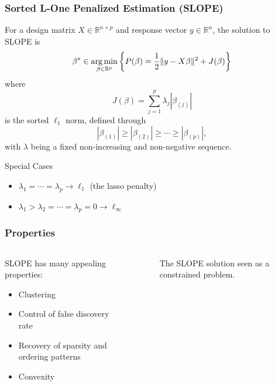\documentclass[10pt,aspectratio=169]{beamer}
\begin{document}
\begin{frame}[c]
  \frametitle{Sorted L-One Penalized Estimation (SLOPE)}

  For a design matrix \(X \in \mathbb{R}^{n \times p}\) and response vector \(y \in \mathbb{R}^n\), the solution to SLOPE is
  \[
    \beta^* \in \operatorname*{arg\,min}_{\beta \in \mathbb{R}^p}
    \left\{P(\beta) =  \frac{1}{2} \lVert {y - X \beta} \rVert^2 + J(\beta)\right\}
  \]
  where
  \begin{equation*}
    J(\beta) = \sum_{j=1}^p \lambda_j|\beta_{(j)}|
  \end{equation*}
  is the \alert{sorted \(\ell_1\) norm}, defined through
  \begin{equation}
    |\beta_{(1)}| \geq |\beta_{(2)}| \geq \cdots \geq |\beta_{(p)}|,
  \end{equation}
  with \(\lambda\) being a fixed non-increasing and non-negative sequence.

  \pause

  \begin{block}{Special Cases}
    \begin{itemize}
      \item \(\lambda_1 = \cdots = \lambda_p \rightarrow \ell_1\) (the lasso penalty)
      \item \(\lambda_1 > \lambda_2 = \cdots = \lambda_p = 0 \rightarrow \ell_\infty\)
    \end{itemize}
  \end{block}

\end{frame}

\begin{frame}[c]
  \frametitle{Properties}

  \begin{columns}
    \begin{column}{0.45\textwidth}
      SLOPE has many appealing properties:
      \begin{itemize}
        \item \alert{Clustering}~\parencite{bogdan2022,schneider2020a,figueiredo2016}
        \item \alert{Control of false discovery rate}~\parencite{bogdan2013,bogdan2015}
        \item \alert{Recovery of sparsity and ordering patterns}~\parencite{bogdan2022}
        \item \alert{Convexity}
      \end{itemize}


    \end{column}
    \begin{column}{0.45\textwidth}
      \begin{figure}
        \centering
        \pgfplotsset{width=7cm,height=7cm}
        
        \caption{%
          The SLOPE solution seen as a constrained problem.
        }
      \end{figure}

    \end{column}
  \end{columns}

\end{frame}
\end{document}
